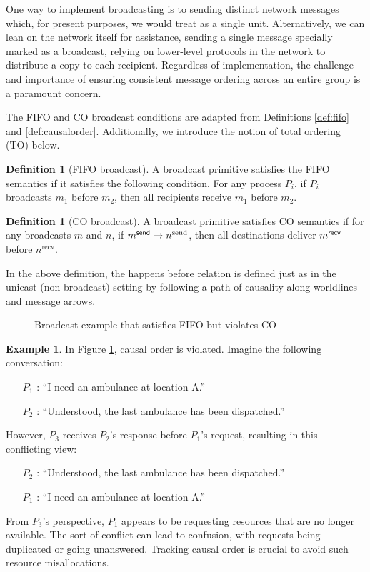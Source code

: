 \documentclass[]             %
{NASA}                       %
\theoremstyle{definition}
\newtheorem{example}[theorem]{Example}
\newtheorem{definition}[theorem]{Definition}
\providecommand{\tightlist}{%
  \setlength{\itemsep}{0pt}\setlength{\parskip}{0pt}}
\begin{document}
One way to implement broadcasting is to sending distinct network
messages which, for present purposes, we would treat as a single
unit. Alternatively, we can lean on the network itself for assistance,
sending a single message specially marked as a broadcast, relying on
lower-level protocols in the network to distribute a copy to each
recipient. Regardless of implementation, the challenge and importance
of ensuring consistent message ordering across an entire group is a
paramount concern.

The FIFO and CO broadcast conditions are adapted from Definitions
\ref{def:fifo} and \ref{def:causalorder}. Additionally, we introduce
the notion of total ordering (TO) below.

\begin{definition}[FIFO broadcast]
  \label{def:fifo-bcast}
  A broadcast primitive satisfies the FIFO semantics if it satisfies
  the following condition. For any process $P_i$, if $P_i$ broadcasts
  $m_1$ before $m_2$, then all recipients receive $m_1$ before $m_2$.
\end{definition}

\begin{definition}[CO broadcast]
  \label{def:causalorder-bcast}
  A broadcast primitive satisfies CO semantics if for any broadcasts
  $m$ and $n$, if $m_{}^{\mathsf{send}} \to n^{\textrm{send}}$, then all
  destinations deliver $m_{}^{\mathsf{recv}}$ before $n^{\textrm{recv}}$.
\end{definition}
In the above definition, the happens before relation is defined just
as in the unicast (non-broadcast) setting by following a path of
causality along worldlines and message arrows.

\begin{figure}[h]
  \centering 
  \caption{Broadcast example that satisfies FIFO but violates CO}
  \label{fig:broadcast-fifo-1}
\end{figure}

\begin{example}
  In Figure \ref{fig:broadcast-fifo-1}, causal order is violated. Imagine the following conversation:
  \begin{itemize}
    \tightlist
  \item [$P_1$]: ``I need an ambulance at location A.''
  \item [$P_2$]: ``Understood, the last ambulance has been dispatched.''
  \end{itemize}
  However, $P_3$ receives $P_2$'s response before $P_1$'s request, resulting in this conflicting view:
  \begin{itemize}
    \tightlist
  \item [$P_2$]: ``Understood, the last ambulance has been dispatched.''
  \item [$P_1$]: ``I need an ambulance at location A.''
  \end{itemize}
  From $P_3$'s perspective, $P_1$ appears to be requesting resources
  that are no longer available. The sort of conflict can lead to
  confusion, with requests being duplicated or going
  unanswered. Tracking causal order is crucial to avoid such resource
  misallocations.
\end{example}
\end{document}
